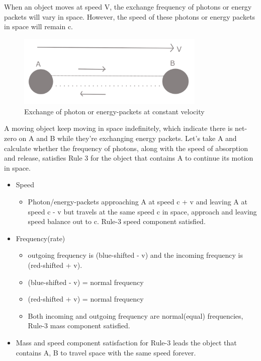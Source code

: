 \documentclass{article}
\begin{document}
    When an object moves at speed V, the exchange frequency of photons or energy packets will vary in space.
    However, the speed of these photons or energy packets in space will remain c.

    \begin{figure}[H]
        \centering
        \includegraphics[width=0.8\textwidth]{images/inertia_constant_velocity}
        \caption{Exchange of photon or energy-packets at constant velocity}
        \label{fig:inertia_constant_velocity}
    \end{figure}

    A moving object keep moving in space indefinitely, which indicate there is net-zero on A and B while they're exchanging energy packets.
    Let’s take A and calculate whether the frequency of photons, along with the speed of absorption and release, satisfies Rule 3 for the object that contains A to continue its motion in space.

    \begin{itemize}
        \item Speed
        \begin{itemize}
            \item Photon/energy-packets  approaching A  at speed c + v and leaving A at speed c - v but travels at the same speed c in space, approach and leaving speed balance out to c.
            Rule-3 speed component satisfied.
        \end{itemize}
        \item Frequency(rate)
        \begin{itemize}
            \item outgoing frequency is (blue-shifted - v) and the incoming frequency is (red-shifted + v).
            \item (blue-shifted - v) = normal frequency
            \item (red-shifted + v) = normal frequency
            \item Both incoming and outgoing frequency are normal(equal) frequencies, Rule-3 mass component satisfied.
        \end{itemize}
        \item Mass and speed component satisfaction for Rule-3 leads the object that contains A, B to travel space with the same speed forever.
    \end{itemize}
\end{document}
